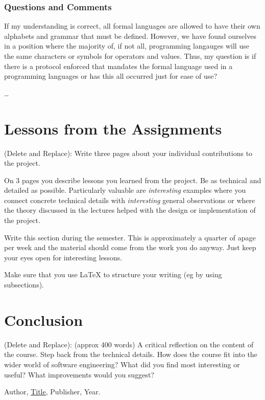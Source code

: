 \documentclass{article}
\theoremstyle{theorem}
\theoremstyle{definition}
\theoremstyle{remark}
\begin{document}
\subsubsection*{Questions and Comments}

If my understanding is correct, all formal languages are allowed to have their own alphabets and grammar that must be defined. However, we have found ourselves in a position where the majority of, if not all, programming langauges will use the same characters or symbols for operators and values. Thus, my question is if there is a protocol enforced that mandates the formal language used in a programming languages or has this all occurred just for ease of use?

\ldots

\section{Lessons from the Assignments}

(Delete and Replace): Write three pages about your individual contributions to the project.

On 3 pages you describe lessons you learned from the project. Be as technical and detailed as possible. Particularly valuable are \emph{interesting} examples where you connect concrete technical details with \emph{interesting} general observations or where the theory discussed in the lectures helped with the design or implementation of the project.

Write this section during the semester. This is approximately a quarter of apage per week and the material should come from the work you do anyway. Just keep your eyes open for interesting lessons.

Make sure that you use \LaTeX{} to structure your writing (eg by using subsections).

\section{Conclusion}\label{conclusion}

(Delete and Replace): (approx 400 words) A critical reflection on the content of the course. Step back from the technical details. How does the course fit into the wider world of software engineering? What did you find most interesting or useful? What improvements would you suggest?

\begin{thebibliography}{99}
 Author, \href{https://en.wikipedia.org/wiki/LaTeX}{Title}, Publisher, Year.
\end{thebibliography}
\end{document}
